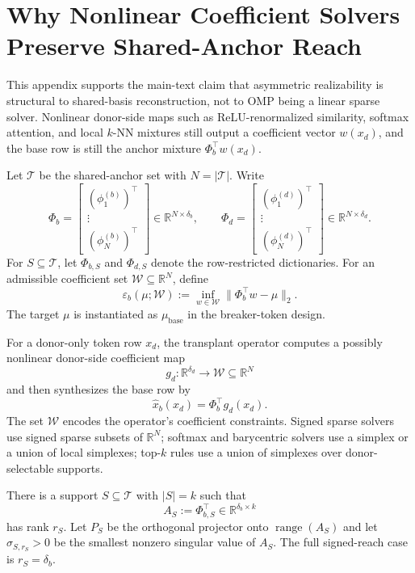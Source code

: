 \section{Why Nonlinear Coefficient Solvers Preserve Shared-Anchor Reach}
\label{app:nonlinear-shared-anchor}

This appendix supports the main-text claim that asymmetric realizability is structural to shared-basis reconstruction, not to OMP being a linear sparse solver. Nonlinear donor-side maps such as ReLU-renormalized similarity, softmax attention, and local $k$-NN mixtures still output a coefficient vector $w(x_d)$, and the base row is still the anchor mixture $\Phi_b^\top w(x_d)$.

Let $\mathcal{T}$ be the shared-anchor set with $N=|\mathcal{T}|$. Write
\[
\Phi_b=
\begin{bmatrix}
(\phi_1^{(b)})^\top\\
\vdots\\
(\phi_N^{(b)})^\top
\end{bmatrix}
\in\mathbb{R}^{N\times\delta_b},
\qquad
\Phi_d=
\begin{bmatrix}
(\phi_1^{(d)})^\top\\
\vdots\\
(\phi_N^{(d)})^\top
\end{bmatrix}
\in\mathbb{R}^{N\times\delta_d}.
\]
For $S\subseteq\mathcal{T}$, let $\Phi_{b,S}$ and $\Phi_{d,S}$ denote the row-restricted dictionaries. For an admissible coefficient set $\mathcal{W}\subseteq\mathbb{R}^N$, define
\[
\varepsilon_b(\mu;\mathcal{W})
:=
\inf_{w\in\mathcal{W}}\|\Phi_b^\top w-\mu\|_2.
\]
The target $\mu$ is instantiated as $\mu_{\mathrm{base}}$ in the breaker-token design.

\begin{assumption}
\label{ass:shared-anchor-final}
For a donor-only token row $x_d$, the transplant operator computes a possibly nonlinear donor-side coefficient map
\[
g_d:\mathbb{R}^{\delta_d}\to\mathcal{W}\subseteq\mathbb{R}^N
\]
and then synthesizes the base row by
\[
\widehat{x}_b(x_d)=\Phi_b^\top g_d(x_d).
\]
The set $\mathcal{W}$ encodes the operator's coefficient constraints. Signed sparse solvers use signed sparse subsets of $\mathbb{R}^N$; softmax and barycentric solvers use a simplex or a union of local simplexes; top-$k$ rules use a union of simplexes over donor-selectable supports.
\end{assumption}

\begin{assumption}
\label{ass:signed-span}
There is a support $S\subseteq\mathcal{T}$ with $|S|=k$ such that
\[
A_S:=\Phi_{b,S}^\top\in\mathbb{R}^{\delta_b\times k}
\]
has rank $r_S$. Let $P_S$ be the orthogonal projector onto $\operatorname{range}(A_S)$ and let $\sigma_{S,r_S}>0$ be the smallest nonzero singular value of $A_S$. The full signed-reach case is $r_S=\delta_b$.
\end{assumption}

